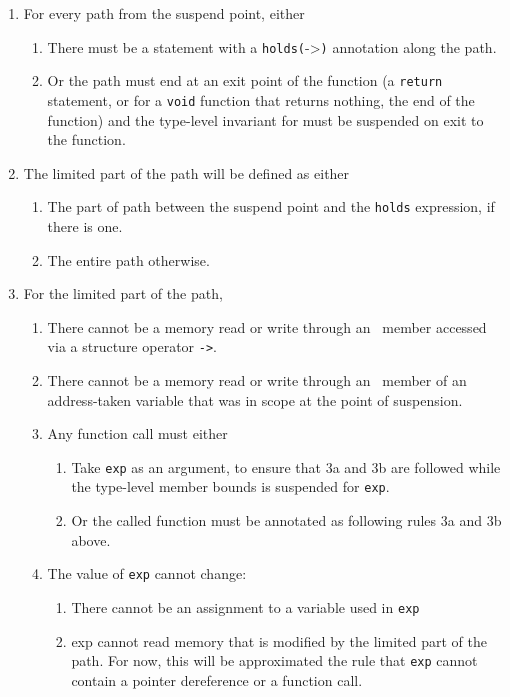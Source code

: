 \begin{enumerate}
\item
  For every path from the suspend point, either

  \begin{enumerate}
  \item
    There must be a statement with a
    \texttt{holds(}-\textgreater{}\texttt{)}
    annotation along the path.
  \item
    Or the path must end at an exit point of the function (a
    \texttt{return} statement, or for a \texttt{void} function that
    returns nothing, the end of the function) and the type-level
    invariant for  must be suspended on exit to the function.
  \end{enumerate}
\item
  The limited part of the path will be defined as either

  \begin{enumerate}
  \item
    The part of path between the suspend point and the \texttt{holds}
    expression, if there is one.
  \item
    The entire path otherwise.
  \end{enumerate}
\item
  For the limited part of the path,

  \begin{enumerate}
  \item
    There cannot be a memory read or write through an
    \arrayptr\ member accessed via a structure operator
    \texttt{-\textgreater{}}.
  \item
    There cannot be a memory read or write through an
    \arrayptr\ member of an address-taken variable that was in
    scope at the point of suspension.
  \item
    Any function call must either

    \begin{enumerate}
    \item
      Take \texttt{exp} as an argument, to ensure that 3a and 3b are
      followed while the type-level member bounds is suspended for
      \texttt{exp}.
    \item
      Or the called function must be annotated as following rules 3a and
      3b above.
    \end{enumerate}
  \item
    The value of \texttt{exp} cannot change:

    \begin{enumerate}
    \item
      There cannot be an assignment to a variable used in \texttt{exp}
    \item
      exp cannot read memory that is modified by the limited part of the
      path. For now, this will be approximated the rule that
      \texttt{exp} cannot contain a pointer dereference or a function
      call.
    \end{enumerate}
  \end{enumerate}
\end{enumerate}

